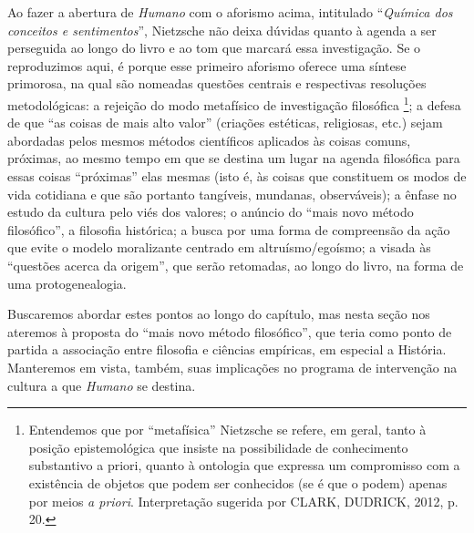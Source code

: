 \documentclass[
	12pt,				%
	openright,			%
	oneside,			%
	a4paper,			%
	english,			%
	french,				%
	spanish,			%
	brazil				%
	]{abntex2}
\begin{document}
Ao fazer a abertura de \textit{Humano} com o aforismo acima, intitulado “\textit{Química dos conceitos e sentimentos}”, Nietzsche não deixa dúvidas quanto à agenda a ser perseguida ao longo do livro e ao tom que marcará essa investigação. Se o reproduzimos aqui, é porque esse primeiro aforismo oferece uma síntese primorosa, na qual são nomeadas questões centrais e respectivas resoluções metodológicas: a rejeição do modo metafísico de investigação filosófica
\footnote{Entendemos que por “metafísica” Nietzsche se refere, em geral, tanto à posição epistemológica que insiste na possibilidade de conhecimento substantivo a priori, quanto à ontologia que expressa um compromisso com a existência de objetos que podem ser conhecidos (se é que o podem) apenas por meios \textit{a priori}. Interpretação sugerida por CLARK, DUDRICK, 2012, p. 20.}; 
a defesa de que “as coisas de mais alto valor” (criações estéticas, religiosas, etc.) sejam abordadas pelos mesmos métodos científicos aplicados às coisas comuns, próximas, ao mesmo tempo em que se destina um lugar na agenda filosófica para essas coisas “próximas” elas mesmas (isto é, às coisas que constituem os modos de vida cotidiana e que são portanto tangíveis, mundanas, observáveis); a ênfase no estudo da cultura pelo viés dos valores; o anúncio do “mais novo método filosófico”, a filosofia histórica; a busca por uma forma de compreensão da ação que evite o modelo moralizante centrado em altruísmo/egoísmo; a visada às “questões acerca da origem”, que serão retomadas, ao longo do livro, na forma de uma protogenealogia.

Buscaremos abordar estes pontos ao longo do capítulo, mas nesta seção nos ateremos à proposta do “mais novo método filosófico”, que teria como ponto de partida a associação entre filosofia e ciências empíricas, em especial a História. Manteremos em vista, também, suas implicações no programa de intervenção na cultura a que \textit{Humano} se destina.
\end{document}
